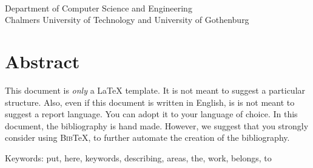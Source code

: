 \oneLineTitle\\
\oneLineSubtitle\\
\MEMBERTILDELIST\\

Department of Computer Science and Engineering\\
Chalmers University of Technology and University of Gothenburg\setlength{\parskip}{0.5cm}

\thispagestyle{plain} 
\setlength{\parskip}{0pt plus 1.0pt}
\section*{Abstract}

This document is \emph{only} a \LaTeX{} template. It is not meant to suggest a particular structure. Also, even if this document is written in English, is is not meant to suggest a report language. You can adopt it to your language of choice. In this document, the bibliography is hand made. However, we suggest that you strongly consider using \textsc{Bib}\TeX{}, to further automate the creation of the bibliography.

\vfill
Keywords: put, here, keywords, describing, areas, the, work, belongs, to

\newpage
\thispagestyle{empty}
\mbox{}